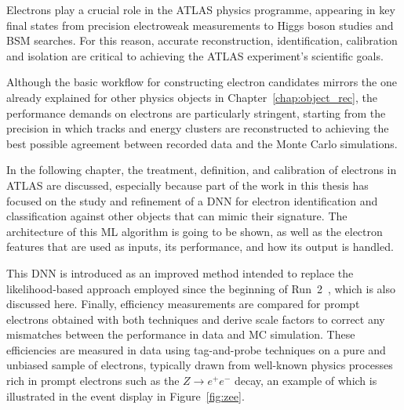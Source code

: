 \newcommand*{\zee}{$Z \to e^{+}e^{-}$\xspace}
\newcommand*{\et}{$E_{\text{T}}$\xspace}
\newcommand*{\zmass}{$\texttt{Z}_{\text{mass}}$\xspace}
\newcommand*{\ziso}{$\texttt{Z}_{\text{iso}}$\xspace}
\newcommand*{\tp}{T$\&$P\xspace}
\newcommand*{\et}{$E_{\text{T}}$\xspace}
\newcommand*{\eta}{$\eta$\xspace}

\setcounter{secnumdepth}{3}

Electrons play a crucial role in the ATLAS physics programme, appearing in key final states from precision electroweak measurements to Higgs boson studies and BSM searches. For this reason, accurate reconstruction, identification, calibration and isolation are critical to achieving the ATLAS experiment’s scientific goals.  

Although the basic workflow for constructing electron candidates mirrors the one already explained for other physics objects in Chapter~\ref{chap:object_rec}, the performance demands on electrons are particularly stringent, starting from the precision in which tracks and energy clusters are reconstructed to achieving the best possible agreement between recorded data and the Monte Carlo simulations.  

In the following chapter, the treatment, definition, and calibration of electrons in ATLAS are discussed, especially because part of the work in this thesis has focused on the study and refinement of a DNN for electron identification and classification against other objects that can mimic their signature.  The architecture of this ML algorithm is going to be shown, as well as the electron features that are used as inputs, its performance, and how its output is handled. 

This DNN is introduced as an improved method intended to replace the likelihood-based approach employed since the beginning of Run~2~\cite{Aad:2684552,Aaboud:2657964}, which is also discussed here.  Finally, efficiency measurements are compared for prompt electrons obtained with both techniques and derive scale factors to correct any mismatches between the performance in data and MC simulation.  These efficiencies are measured in data using tag-and-probe techniques on a pure and unbiased sample of electrons, typically drawn from well-known physics processes rich in prompt electrons such as the $Z\to e^+e^-$ decay, an example of which is illustrated in the event display in Figure~\ref{fig:zee}.

